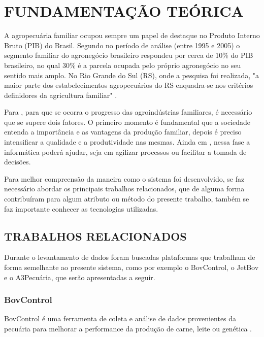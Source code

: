 %
%


\chapter{\textbf{FUNDAMENTAÇÃO TEÓRICA}}\label{chap:fundTeorica}

A agropecuária familiar ocupou sempre um papel de destaque no Produto Interno Bruto (PIB) do Brasil. Segundo  no período de análise (entre 1995 e 2005) o segmento familiar do agronegócio brasileiro respondeu por cerca de 10\% do PIB brasileiro, no qual 30\% é a parcela ocupada pelo próprio agronegócio no seu sentido mais amplo. No Rio Grande do Sul (RS), onde a pesquisa foi realizada, "a maior parte dos estabelecimentos agropecuários do RS enquadra-se nos critérios definidores da agricultura familiar" \cite{fee15}.

Para , para que se ocorra o progresso das agroindústrias familiares, é necessário que se supere dois fatores. O primeiro momento é fundamental que a sociedade entenda a importância e as vantagens da produção familiar, depois é preciso intensificar a qualidade e a produtividade nas mesmas. Ainda em , nessa fase a informática poderá ajudar, seja em agilizar processos ou facilitar a tomada de decisões.

Para melhor compreensão da maneira como o sistema foi desenvolvido, se faz necessário abordar os principais trabalhos relacionados, que de alguma forma contribuíram para algum atributo ou método do presente trabalho, também se faz importante conhecer as tecnologias utilizadas.

\section{TRABALHOS RELACIONADOS}


Durante o levantamento de dados foram buscadas plataformas que trabalham de forma semelhante ao presente sistema, como por exemplo o BovControl, o JetBov e o A3Pecuária, que serão apresentadas a seguir.

\subsection{\textbf{BovControl}}

BovControl é uma ferramenta de coleta e análise de dados provenientes da pecuária para melhorar a performance da produção de carne, leite ou genética \cite{bovcontrol10}.

